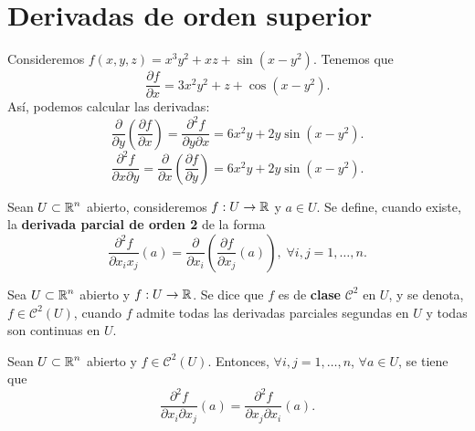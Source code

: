 \section{Derivadas de orden superior}
\begin{eg}
Consideremos $\displaystyle f\left(x,y,z\right)= x^{3}y^{2} + xz + \sin\left(x-y^{2}\right) $. Tenemos que 
\[\frac{\partial f}{\partial x} = 3x^{2}y^{2}+z+ \cos\left(x-y^{2}\right) .\]
Así, podemos calcular las derivadas:
\[\frac{\partial}{\partial y}\left(\frac{\partial f}{\partial x}\right)= \frac{\partial ^{2}f}{\partial y\partial x} = 6x^{2}y + 2y\sin\left(x-y^{2}\right) .\]
\[\frac{\partial^{2} f}{\partial x \partial y} = \frac{\partial }{\partial x}\left(\frac{\partial f}{\partial y}\right)=6x^{2}y +2y\sin\left(x-y^{2}\right) .\]
\end{eg}
\begin{definition}
Sean $\displaystyle U \subset \mathbb{R}^{n} $ abierto, consideremos $\displaystyle f : U \to \mathbb{R} $ y $\displaystyle a \in U $. Se define, cuando existe, la \textbf{derivada parcial de orden 2} de la forma
\[\frac{\partial^{2}f}{\partial x_{i}x_{j}}\left(a\right) = \frac{\partial }{\partial x_{i}}\left(\frac{\partial f}{\partial x_{j}}\left(a\right)\right), \; \forall i,j = 1, \ldots, n .\]
\end{definition}
\begin{definition}
Sea $\displaystyle U \subset \mathbb{R}^{n} $ abierto y $\displaystyle f : U \to \mathbb{R} $. Se dice que $\displaystyle f $ es de \textbf{clase} $\displaystyle \mathcal{C}^{2} $ en $\displaystyle U $, y se denota, $\displaystyle f \in \mathcal{C}^{2}\left(U\right) $, cuando $\displaystyle f $ admite todas las derivadas parciales segundas en $\displaystyle U $ y todas son continuas en $\displaystyle U $.
\end{definition}
\begin{theorem}
Sean $\displaystyle U\subset \mathbb{R}^{n} $ abierto y $\displaystyle f \in \mathcal{C}^{2}\left(U\right) $. Entonces, $\displaystyle \forall i,j = 1, \ldots, n $, $\displaystyle \forall a \in U $, se tiene que 
\[\frac{\partial^{2}f}{\partial x_{i}\partial x_{j}}\left(a\right)= \frac{\partial^{2}f}{\partial x_{j}\partial x_{i}} \left(a\right).\]
\end{theorem}
